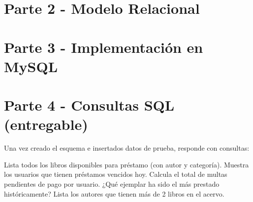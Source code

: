 \documentclass[letterpaper,12pt]{article}
\begin{document}
\section{Parte 2 - Modelo Relacional }

\section{Parte 3 - Implementación en MySQL }

\section{Parte 4 - Consultas SQL (entregable)}
Una vez creado el esquema e insertados datos de prueba, responde con consultas:

Lista todos los libros disponibles para préstamo (con autor y categoría). Muestra los usuarios que tienen préstamos vencidos hoy. Calcula el total de multas pendientes de pago por usuario. ¿Qué ejemplar ha sido el más prestado históricamente? Lista los autores que tienen más de 2 libros en el acervo.
\end{document}
